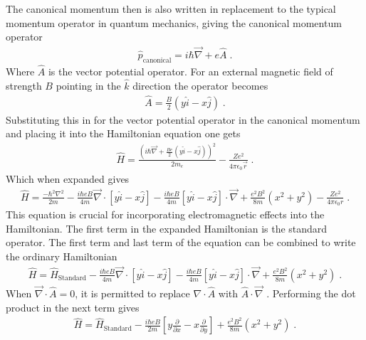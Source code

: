         The canonical momentum then is also written in replacement to the typical momentum operator in quantum mechanics, giving the canonical momentum operator 
        \begin{align}
            \hat{p}_{\text{canonical}} = i \hbar \vec{\nabla} + e \hat{A} \;.
        \end{align}
        \noindent Where $\hat{A}$ is the vector potential operator. For an external magnetic field of strength $B$ pointing in the $\hat{k}$ direction the operator becomes 
        \begin{align}
            \hat{A} = \frac{B}{2} \left(y \hat{i} - x \hat{j} \right)\;.
        \end{align}
        \noindent Substituting this in for the vector potential operator in the canonical momentum and placing it into the Hamiltonian equation one gets 
        \begin{align}
            \hat{H} = \frac{\left(i\hbar \vec{\nabla} + \frac{Be}{2}\left(y \hat{i} - x \hat{j} \right)\right)^2}{2m_e} - \frac{Ze^2}{4 \pi \epsilon_0 \vec{r}}\;.
        \end{align}
        \noindent Which when expanded gives
        \small
        \begin{align}
            \hat{H} = \frac{-\hbar^2 \nabla^2}{2m} - \frac{i\hbar e B}{4m} \vec{\nabla} \cdot \left[y\hat{i} - x\hat{j} \right] - \frac{i\hbar e B}{4m} \left[y\hat{i} - x\hat{j} \right] \cdot \vec{\nabla} + \frac{e^2B^2}{8m} \left(x^2 + y^2\right) - \frac{Ze^2}{4\pi \epsilon_0 r}\;.
        \end{align}
        \normalsize
        \noindent This equation is crucial for incorporating electromagnetic effects into the Hamiltonian. The first term in the expanded Hamiltonian is the standard operator. The first term and last term of the equation can be combined to write the ordinary Hamiltonian 
        \begin{align}
            \hat{H} =  \hat{H}_{\text{Standard}} - \frac{i\hbar e B}{4m} \vec{\nabla} \cdot \left[y\hat{i} - x\hat{j} \right] - \frac{i\hbar e B}{4m} \left[y\hat{i} - x\hat{j} \right] \cdot \vec{\nabla} + \frac{e^2B^2}{8m} \left(x^2 + y^2\right)\;.
        \end{align}
        \noindent When $\vec{\nabla} \cdot \hat{A} = 0$, it is permitted to replace $\nabla \cdot \hat{A}$ with $\hat{A} \cdot \vec{\nabla}$ \cite{Sakurai_Napolitano_2020}. Performing the dot product in the next term gives 
        \begin{align}
            \hat{H} =  \hat{H}_{\text{Standard}} - \frac{i\hbar e B}{2m} \left[y \frac{\partial}{\partial x} - x \frac{\partial}{\partial y} \right]+ \frac{e^2B^2}{8m} \left(x^2 + y^2\right)\;.
        \end{align}
